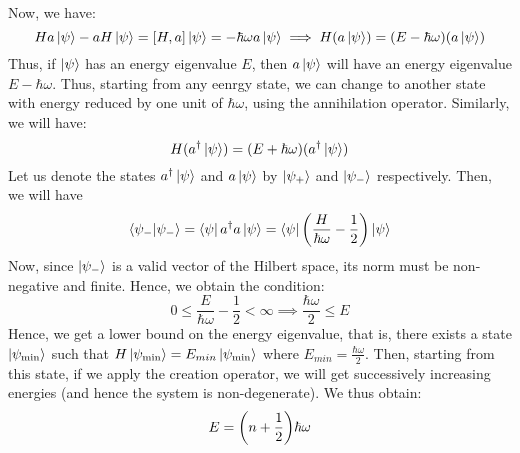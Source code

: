 Now, we have:
$$Ha\ket{\psi} - aH\ket{\psi} = \left[ H, a \right]\ket{\psi} = -\hbar\omega a \ket{\psi} \implies H(a\ket{\psi})= (E-\hbar\omega)(a\ket{\psi})$$
Thus, if $\ket{\psi}$ has an energy eigenvalue $E$, then $a\ket{\psi}$ will have an energy eigenvalue $E-\hbar\omega$. Thus, starting from any eenrgy state, we can change to another state with energy reduced by one unit of $\hbar\omega$, using the annihilation operator. Similarly, we will have:
$$H(a^\dagger\ket{\psi})  = (E+\hbar\omega)(a^\dagger\ket{\psi}) $$
Let us denote the states $a^\dagger\ket{\psi}$ and $a\ket{\psi}$ by $\ket{\psi_+}$ and $\ket{\psi_-}$ respectively. 
Then, we will have $$\ip{\psi_-}{\psi_-} = \bra{\psi} a^\dagger a \ket{\psi} = \bra{{\psi}}\qty(\frac{H}{\hbar\omega}-\frac{1}{2})\ket{\psi}$$
Now, since $\ket{\psi_-}$ is a valid vector of the Hilbert space, its norm must be non-negative and finite. Hence, we obtain the condition:
$$0\leq \frac{E}{\hbar\omega}-\frac{1}{2}<\infty\implies \frac{\hbar\omega}{2}\leq E$$
Hence, we get a lower bound on the energy eigenvalue, that is, there exists a state $\ket{\psi_{\mathrm{min}}}$ such that $H\ket{\psi_{\mathrm{min}}} = E_{min}\ket{\psi_{\mathrm{min}}}$ where $E_{min} = \frac{\hbar\omega}{2}$. Then, starting from this state, if we apply the creation operator, we will get successively increasing energies (and hence the system is non-degenerate). We thus obtain:
$$E = \qty({n+\frac{1}{2}}){\hbar\omega}$$
